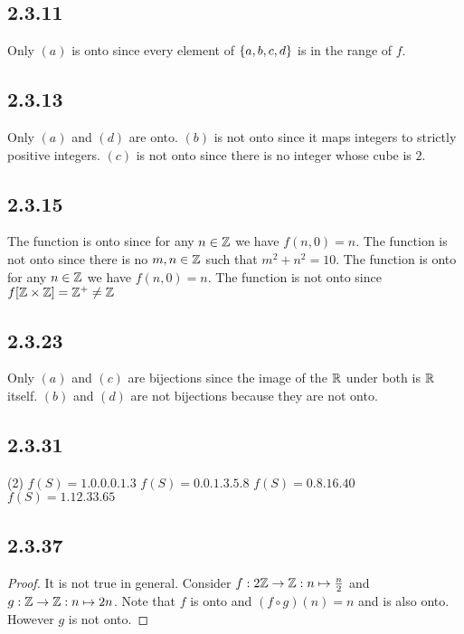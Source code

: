 \documentclass[12pt,titlepage]{extarticle}
\begin{document}
\subsection*{2.3.11}
Only $(a)$ is onto since every element of $\qty{a,b,c,d}$ is in the range of $f$.

\subsection*{2.3.13}
Only $(a)$ and $(d)$ are onto. $(b)$ is not onto since it maps integers to strictly positive integers. $(c)$ is not onto since there is no integer whose cube is $2$.

\subsection*{2.3.15}
\begin{tasks}
    \task The function is onto since for any $n \in \mathbb{Z}$ we have $f(n, 0) = n$.
    \task The function is not onto since there is no $m,n \in \mathbb{Z}$ such that $m^2 + n^2 = 10$.
    \task The function is onto for any $n \in \mathbb{Z}$ we have $f(n, 0) = n$.
    \task The function is not onto since $f[\mathbb{Z} \times \mathbb{Z}] = \mathbb{Z}^+ \neq \mathbb{Z}$
\end{tasks}

\subsection*{2.3.23}
Only $(a)$ and $(c)$ are bijections since the image of the $\mathbb{R}$ under both is $\mathbb{R}$ itself. $(b)$ and $(d)$ are not bijections because they are not onto.

\subsection*{2.3.31}
\begin{tasks}(2)
    \task $f(S) = \qty{1, 0, 0, 0, 1, 3}$
    \task $f(S) = \qty{0, 0, 1, 3, 5, 8}$
    \task $f(S) = \qty{0, 8, 16, 40}$
    \task $f(S) = \qty{1, 12, 33, 65}$
\end{tasks}

\subsection*{2.3.37}
\begin{proof}
    It is not true in general. Consider $f : 2 \mathbb{Z} \to \mathbb{Z} : n \mapsto \frac{n}{2}$ and $g : \mathbb{Z} \to \mathbb{Z} : n \mapsto 2n$. Note that $f$ is onto and $(f \circ g)(n) = n$ and is also onto. However $g$ is not onto.
\end{proof}
\end{document}
